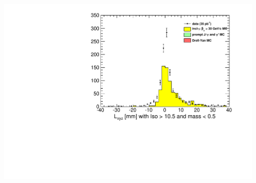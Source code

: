 \documentclass[compress]{beamer}
\begin{document}
\begin{frame}
\begin{columns}
\includegraphics[width=\linewidth]{lowdimuon_lxyz_lowmass_noniso.pdf}
\end{columns}
\end{frame}
\end{document}
